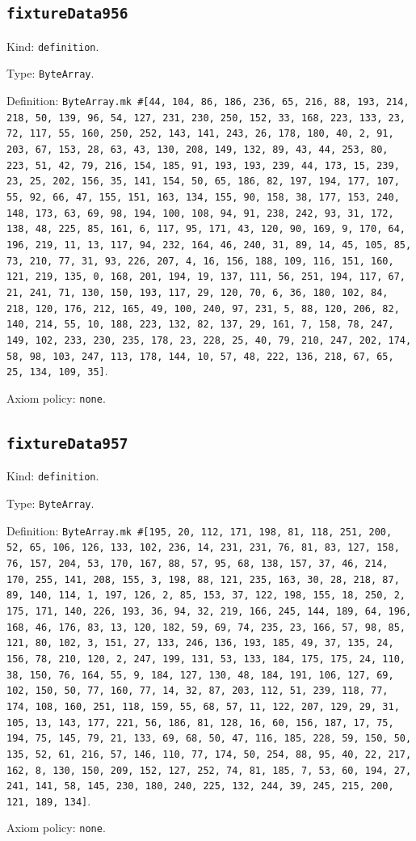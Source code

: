 \documentclass[11pt]{article}
\begin{document}
\subsection*{\texttt{fixtureData956}}
\noindent Kind: \texttt{definition}.\par
\noindent Type: \texttt{ByteArray}.\par
\noindent Definition: \texttt{ByteArray.mk \#[44, 104, 86, 186, 236, 65, 216, 88, 193, 214, 218, 50, 139, 96, 54, 127, 231, 230, 250, 152, 33, 168, 223, 133, 23, 72, 117, 55, 160, 250, 252, 143, 141, 243, 26, 178, 180, 40, 2, 91, 203, 67, 153, 28, 63, 43, 130, 208, 149, 132, 89, 43, 44, 253, 80, 223, 51, 42, 79, 216, 154, 185, 91, 193, 193, 239, 44, 173, 15, 239, 23, 25, 202, 156, 35, 141, 154, 50, 65, 186, 82, 197, 194, 177, 107, 55, 92, 66, 47, 155, 151, 163, 134, 155, 90, 158, 38, 177, 153, 240, 148, 173, 63, 69, 98, 194, 100, 108, 94, 91, 238, 242, 93, 31, 172, 138, 48, 225, 85, 161, 6, 117, 95, 171, 43, 120, 90, 169, 9, 170, 64, 196, 219, 11, 13, 117, 94, 232, 164, 46, 240, 31, 89, 14, 45, 105, 85, 73, 210, 77, 31, 93, 226, 207, 4, 16, 156, 188, 109, 116, 151, 160, 121, 219, 135, 0, 168, 201, 194, 19, 137, 111, 56, 251, 194, 117, 67, 21, 241, 71, 130, 150, 193, 117, 29, 120, 70, 6, 36, 180, 102, 84, 218, 120, 176, 212, 165, 49, 100, 240, 97, 231, 5, 88, 120, 206, 82, 140, 214, 55, 10, 188, 223, 132, 82, 137, 29, 161, 7, 158, 78, 247, 149, 102, 233, 230, 235, 178, 23, 228, 25, 40, 79, 210, 247, 202, 174, 58, 98, 103, 247, 113, 178, 144, 10, 57, 48, 222, 136, 218, 67, 65, 25, 134, 109, 35]}.\par
\noindent Axiom policy: \texttt{none}.\par
\subsection*{\texttt{fixtureData957}}
\noindent Kind: \texttt{definition}.\par
\noindent Type: \texttt{ByteArray}.\par
\noindent Definition: \texttt{ByteArray.mk \#[195, 20, 112, 171, 198, 81, 118, 251, 200, 52, 65, 106, 126, 133, 102, 236, 14, 231, 231, 76, 81, 83, 127, 158, 76, 157, 204, 53, 170, 167, 88, 57, 95, 68, 138, 157, 37, 46, 214, 170, 255, 141, 208, 155, 3, 198, 88, 121, 235, 163, 30, 28, 218, 87, 89, 140, 114, 1, 197, 126, 2, 85, 153, 37, 122, 198, 155, 18, 250, 2, 175, 171, 140, 226, 193, 36, 94, 32, 219, 166, 245, 144, 189, 64, 196, 168, 46, 176, 83, 13, 120, 182, 59, 69, 74, 235, 23, 166, 57, 98, 85, 121, 80, 102, 3, 151, 27, 133, 246, 136, 193, 185, 49, 37, 135, 24, 156, 78, 210, 120, 2, 247, 199, 131, 53, 133, 184, 175, 175, 24, 110, 38, 150, 76, 164, 55, 9, 184, 127, 130, 48, 184, 191, 106, 127, 69, 102, 150, 50, 77, 160, 77, 14, 32, 87, 203, 112, 51, 239, 118, 77, 174, 108, 160, 251, 118, 159, 55, 68, 57, 11, 122, 207, 129, 29, 31, 105, 13, 143, 177, 221, 56, 186, 81, 128, 16, 60, 156, 187, 17, 75, 194, 75, 145, 79, 21, 133, 69, 68, 50, 47, 116, 185, 228, 59, 150, 50, 135, 52, 61, 216, 57, 146, 110, 77, 174, 50, 254, 88, 95, 40, 22, 217, 162, 8, 130, 150, 209, 152, 127, 252, 74, 81, 185, 7, 53, 60, 194, 27, 241, 141, 58, 145, 230, 180, 240, 225, 132, 244, 39, 245, 215, 200, 121, 189, 134]}.\par
\noindent Axiom policy: \texttt{none}.\par
\end{document}
